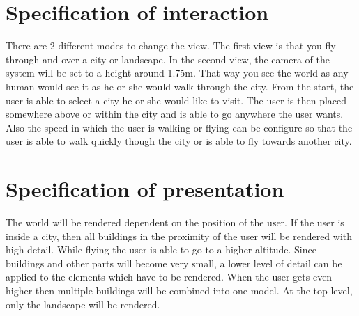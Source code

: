 \section{Specification of interaction}
\label{sec:SpecificationOfInteraction}
There are 2 different modes to change the view. The first view is that you fly through and over a city or landscape. In the second view, the camera of the system will be set to a height around 1.75m. That way you see the world as any human would see it as he or she would walk through the city. From the start, the user is able to select a city he or she would like to visit. The user is then placed somewhere above or within the city and is able to go anywhere the user wants. Also the speed in which the user is walking or flying can be configure so that the user is able to walk quickly though the city or is able to fly towards another city.

\section{Specification of presentation}
\label{sec:SpecificationOfPresentation}
The world will be rendered dependent on the position of the user. If the user is inside a city, then all buildings in the proximity of the user will be rendered with high detail. While flying the user is able to go to a higher altitude. Since buildings and other parts will become very small, a lower level of detail can be applied to the elements which have to be rendered. When the user gets even higher then multiple buildings will be combined into one model. At the top level, only the landscape will be rendered. 